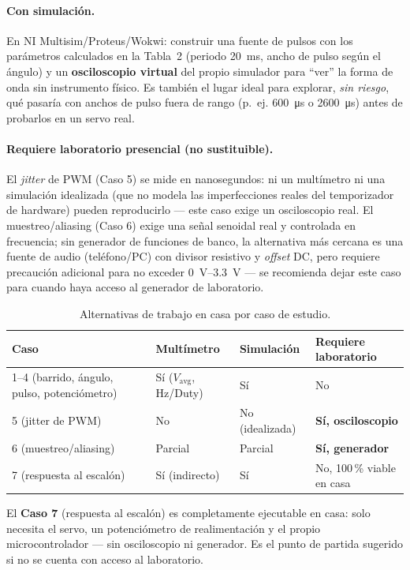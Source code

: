 \documentclass[11pt]{article}
\begin{document}
\paragraph{Con simulación.} En NI Multisim/Proteus/Wokwi: construir una fuente de pulsos
con los parámetros calculados en la Tabla~2 (periodo \SI{20}{\milli\second}, ancho de
pulso según el ángulo) y un \textbf{osciloscopio virtual} del propio simulador para ``ver''
la forma de onda sin instrumento físico. Es también el lugar ideal para explorar,
\emph{sin riesgo}, qué pasaría con anchos de pulso fuera de rango (p.\ ej. \SI{600}{\micro\second}
o \SI{2600}{\micro\second}) antes de probarlos en un servo real.

\paragraph{Requiere laboratorio presencial (no sustituible).} El \emph{jitter} de PWM
(Caso 5) se mide en nanosegundos: ni un multímetro ni una simulación idealizada (que no
modela las imperfecciones reales del temporizador de hardware) pueden reproducirlo — este
caso exige un osciloscopio real. El muestreo/aliasing (Caso 6) exige una señal senoidal
real y controlada en frecuencia; sin generador de funciones de banco, la alternativa más
cercana es una fuente de audio (teléfono/PC) con divisor resistivo y \emph{offset} DC,
pero requiere precaución adicional para no exceder \SIrange{0}{3.3}{\volt} — se recomienda
dejar este caso para cuando haya acceso al generador de laboratorio.

\begin{table}[H]\centering
\caption{Alternativas de trabajo en casa por caso de estudio.}
\label{tab:casa5}
\begin{tabular}{p{4.6cm}p{3.0cm}p{2.0cm}p{3.2cm}}
\toprule
Caso & Multímetro & Simulación & Requiere laboratorio \\
\midrule
1--4 (barrido, ángulo, pulso, potenciómetro) & Sí ($V_\text{avg}$, Hz/Duty) & Sí & No \\
5 (jitter de PWM) & No & No (idealizada) & \textbf{Sí, osciloscopio} \\
6 (muestreo/aliasing) & Parcial & Parcial & \textbf{Sí, generador} \\
7 (respuesta al escalón) & Sí (indirecto) & Sí & No, 100\,\% viable en casa \\
\bottomrule
\end{tabular}
\end{table}

\begin{nota}
El \textbf{Caso 7} (respuesta al escalón) es completamente ejecutable en casa: solo
necesita el servo, un potenciómetro de realimentación y el propio microcontrolador — sin
osciloscopio ni generador. Es el punto de partida sugerido si no se cuenta con acceso al
laboratorio.
\end{nota}
\end{document}

